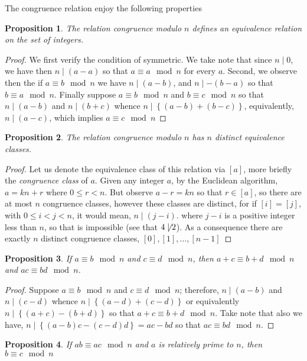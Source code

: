 \documentclass[11pt,a4paper]{article}
\newtheorem{claim}{Proposition}
\begin{document}
The congruence relation enjoy the following properties
\begin{claim}
	The relation \emph{congruence modulo $n$} defines an equivalence relation on the set of integers.
\end{claim}
\begin{proof}
	We first verify the condition of symmetric. We take note that since $n \mid 0$, we have then $ n \mid (a-a)$ so that $ a \equiv a \mod{n}$ for every $a$. Second, we observe then the if $ a \equiv b \mod{n} $ we have $ n \mid (a-b) $, and $ n \mid -(b-a) $ so that $ b \equiv a \mod{n} $. Finally  suppose $ a \equiv b \mod{n} $ and $ b \equiv c \mod{n} $ so that $ n \mid (a-b) $ and $ n \mid (b+c) $ whence $ n \mid \left\lbrace (a -b) + (b -c) \right\rbrace $, equivalently, $ n \mid (a - c) $, which implies $ a \equiv c \mod{n} $
\end{proof}
\begin{claim}
	The relation congruence modulo $n$ has $n$ distinct equivalence classes.
\end{claim}
\begin{proof}
	Let us denote the equivalence class of this relation via $[a]$, more briefly the \emph{congruence class} of $a$. Given any integer $a$, by the Euclidean algorithm, $a = kn + r$ where $ 0 \leq r < n$. But observe $ a -r = kn$ so that $ r \in [a] $, so there are at most $n$ congruence classes, however these classes are distinct, for if $[i] = [j]$, with $ 0 \leq i < j < n$, it would mean, $ n \mid (j-i) $. where $j-i$ is a positive integer less than $n$, so that is impossible (see that $4 \not\mid 2$). As a consequence there are exactly $n$ distinct congruence classes, $[0],[1], \ldots, [n-1]$ 
\end{proof}
\begin{claim}
	If $ a \equiv b \mod{n} $ and $ c \equiv d \mod{n}$, then $ a + c \equiv b + d \mod{n} $ and $ac \equiv bd \mod{n}$.
\end{claim}
\begin{proof}
	Suppose $a \equiv b \mod{n} $ and $ c \equiv d \mod{n} $; therefore, $ n \mid (a-b) $ and $ n \mid (c-d) $ whence  $ n \mid  \left\lbrace (a-d) + (c-d) \right\rbrace $ or equivalently	$ n \mid  \left\lbrace (a+c) - (b+d) \right\rbrace$ so that $ a + c \equiv b+d \mod{n} $. Take note that also we have, $ n \mid \left\lbrace (a-b)c - (c-d)d \right\rbrace = ac - bd$ so that $ ac \equiv bd \mod{n}$.
\end{proof}
\begin{claim}
	If $ab \equiv ac \mod{n} $ and $a$ is relatively prime to $n$, then $ b \equiv c \mod{n} $
\end{claim}
\end{document}
